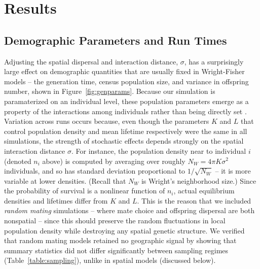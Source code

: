 \documentclass[10pt,twoside,lineno,hidelinks]{preprint}
\begin{document}
\section{Results}

\subsection{Demographic Parameters and Run Times}

Adjusting the spatial dispersal and interaction distance, $\sigma$,
has a surprisingly large effect on demographic quantities that are usually fixed in Wright-Fisher models --
the generation time, census population size, and variance in offspring number, shown in Figure~\ref{fig:genparams}. Because our simulation is paramaterized on an individual level, these population parameters emerge as a property of the interactions among individuals rather than being directly set .
Variation across runs occurs because,
even though the parameters $K$ and $L$ that control population density and mean lifetime respectively  
were the same in all simulations,
the strength of stochastic effects depends strongly on the spatial interaction distance $\sigma$.
For instance, 
the population density near to individual $i$ (denoted $n_i$ above)
is computed by averaging over roughly $N_W = 4 \pi K \sigma^2$ individuals,
and so has standard deviation proportional to $1/\sqrt{N_W}$ --
it is more variable at lower densities.
(Recall that $N_W$ is Wright's neighborhood size.)
Since the probability of survival is a nonlinear function of $n_i$,
actual equilibrium densities and lifetimes differ from $K$ and $L$.
This is the reason that we included \emph{random mating} simulations --
where mate choice and offspring dispersal are both nonspatial --
since this should preserve the random fluctuations in local population density
while destroying any spatial genetic structure.
We verified that random mating models retained no geographic signal
by showing that summary statistics did not differ significantly between sampling regimes
(Table~\ref{table:sampling}), unlike in spatial models (discussed below).
\end{document}
